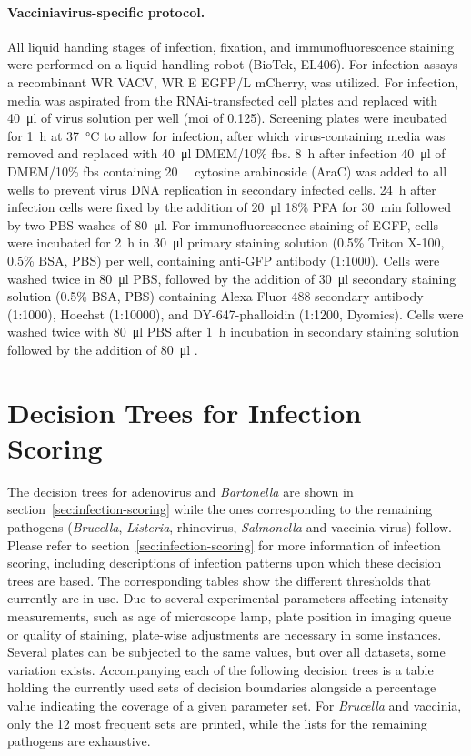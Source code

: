 \paragraph{Vacciniavirus-specific protocol.}
All liquid handing stages of infection, fixation, and immunofluorescence staining were performed on a liquid handling robot (BioTek, EL406). For infection assays a recombinant WR VACV, WR E EGFP\slash L mCherry, was utilized. For infection, media was aspirated from the RNAi-transfected cell plates and replaced with \SI{40}{\micro\litre} of virus solution per well (\gls{moi} of 0.125). Screening plates were incubated for \SI{1}{\hour} at \SI{37}{\celsius} to allow for infection, after which virus-containing media was removed and replaced with \SI{40}{\micro\litre} DMEM\slash 10\% \gls{fbs}. \SI{8}{\hour} after infection \SI{40}{\micro\litre} of DMEM\slash 10\% \gls{fbs} containing \SI{20}{\micro\Molar} cytosine arabinoside (AraC) was added to all wells to prevent virus DNA replication in secondary infected cells. \SI{24}{\hour} after infection cells were fixed by the addition of \SI{20}{\micro\litre} 18\% PFA for \SI{30}{\minute} followed by two PBS washes of \SI{80}{\micro\litre}. For immunofluorescence staining of EGFP, cells were incubated for \SI{2}{\hour} in \SI{30}{\micro\litre} primary staining solution (0.5\% Triton X-100, 0.5\% BSA, PBS) per well, containing anti-GFP antibody (1:1000). Cells were washed twice in \SI{80}{\micro\litre} PBS, followed by the addition of \SI{30}{\micro\litre} secondary staining solution (0.5\% BSA, PBS) containing Alexa Fluor 488 secondary antibody (1:1000), Hoechst (1:10000), and DY-647-phalloidin (1:1200, Dyomics). Cells were washed twice with \SI{80}{\micro\litre} PBS after \SI{1}{\hour} incubation in secondary staining solution followed by the addition of \SI{80}{\micro\litre} .

\section{Decision Trees for Infection Scoring}
\label{sec:app-dectree}
The decision trees for adenovirus and \textit{Bartonella} are shown in section~\ref{sec:infection-scoring} while the ones corresponding to the remaining pathogens (\textit{Brucella}, \textit{Listeria}, rhinovirus, \textit{Salmonella} and vaccinia virus) follow. Please refer to section~\ref{sec:infection-scoring} for more information of infection scoring, including descriptions of infection patterns upon which these decision trees are based. The corresponding tables show the different thresholds that currently are in use. Due to several experimental parameters affecting intensity measurements, such as age of microscope lamp, plate position in imaging queue or quality of staining, plate-wise adjustments are necessary in some instances. Several plates can be subjected to the same values, but over all datasets, some variation exists. Accompanying each of the following decision trees is a table holding the currently used sets of decision boundaries alongside a percentage value indicating the coverage of a given parameter set. For \textit{Brucella} and vaccinia, only the 12 most frequent sets are printed, while the lists for the remaining pathogens are exhaustive.

